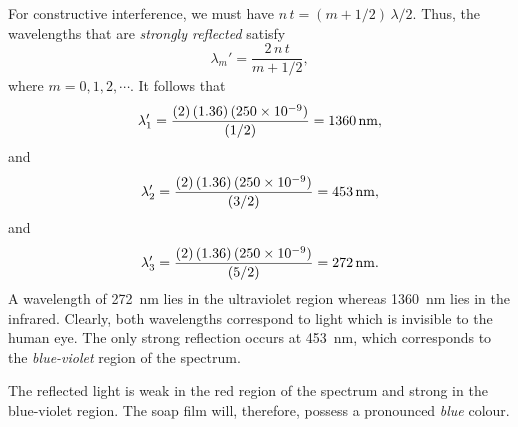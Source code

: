 For constructive interference, we must have $n\,t=(m+1/2)\,\lambda/2$. Thus, the wavelengths that are {\em strongly
reflected}\/ satisfy
$$
\lambda_m' = \frac{2\,n\,t}{m+1/2},
$$
where $m=0,1,2,\cdots$. It follows that
$$
\lambda_1' = \frac{(2)\,(1.36)\,(250\times 10^{-9})}{(1/2)} = 1360\,{\rm nm},
$$
and
$$
\lambda_2' = \frac{(2)\,(1.36)\,(250\times 10^{-9})}{(3/2)} = 453\,{\rm nm},
$$
and
$$
\lambda_3' = \frac{(2)\,(1.36)\,(250\times 10^{-9})}{(5/2)} = 272\,{\rm nm}.
$$
A wavelength of 272~nm lies in the ultraviolet region whereas 
1360~nm lies in the infrared. Clearly, both wavelengths correspond
to light which is invisible to the human eye. The only strong reflection
occurs at 453~nm, which corresponds to the {\em blue-violet}\/ region
of the spectrum.

The reflected light is weak in the red region of the spectrum and
strong in the blue-violet region. The soap film will, therefore, possess
a pronounced {\em blue}\/ colour.

